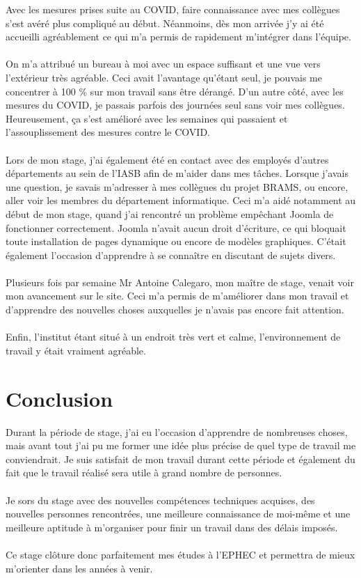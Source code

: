 \documentclass[11pt]{article}
\begin{document}
Avec les mesures prises suite au COVID, faire connaissance avec mes collègues s'est avéré plus compliqué au début.
Néanmoins, dès mon arrivée j'y ai été accueilli agréablement ce qui m'a permis de rapidement m'intégrer dans l'équipe.\\
\\
On m'a attribué un bureau à moi avec un espace suffisant et une vue vers l'extérieur très agréable.
Ceci avait l'avantage qu'étant seul, je pouvais me concentrer à 100 \% sur mon travail sans être dérangé.
D'un autre côté, avec les mesures du COVID, je passais parfois des journées seul sans voir mes collègues.
Heureusement, ça s'est amélioré avec les semaines qui passaient et l'assouplissement des mesures contre le COVID.\\
\\
Lors de mon stage, j'ai également été en contact avec des employés d'autres départements au sein de l'IASB afin de m'aider dans mes tâches.
Lorsque j'avais une question, je savais m'adresser à mes collègues du projet BRAMS, ou encore, aller voir les membres du département informatique.
Ceci m'a aidé notamment au début de mon stage, quand j'ai rencontré un problème empêchant Joomla de fonctionner correctement.
Joomla n'avait aucun droit d'écriture, ce qui bloquait toute installation de pages dynamique ou encore de modèles graphiques.
C'était également l'occasion d'apprendre à se connaître en discutant de sujets divers.\\
\\
Plusieurs fois par semaine Mr Antoine Calegaro, mon maître de stage, venait voir mon avancement sur le site.
Ceci m'a permis de m'améliorer dans mon travail et d'apprendre des nouvelles choses auxquelles je n'avais pas encore fait attention.\\
\\
Enfin, l'institut étant situé à un endroit très vert et calme, l'environnement de travail y était vraiment agréable.

\newpage

\section{Conclusion}
Durant la période de stage, j'ai eu l'occasion d'apprendre de nombreuses choses, mais avant tout j'ai pu me former une idée plus précise de quel type de travail me conviendrait.
Je suis satisfait de mon travail durant cette période et également du fait que le travail réalisé sera utile à grand nombre de personnes.\\
\\
Je sors du stage avec des nouvelles compétences techniques acquises, des nouvelles personnes rencontrées, une meilleure connaissance de moi-même et une meilleure aptitude à m'organiser pour finir un travail dans des délais imposés.\\
\\
Ce stage clôture donc parfaitement mes études à l'EPHEC et permettra de mieux m'orienter dans les années à venir.
\end{document}
